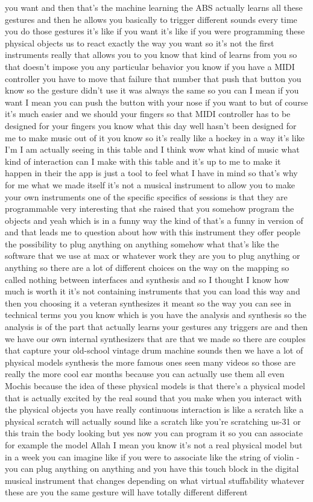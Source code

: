 you want and then that's the machine learning the ABS actually learns all these gestures and then he allows you basically to trigger different sounds every time you do those gestures it's like if you want it's like if you were programming these physical objects us to react exactly the way you want so it's not the first instruments really that allows you to you know that kind of learns from you so that doesn't impose you any particular behavior you know if you have a MIDI controller you have to move that failure that number that push that button you know so the gesture didn't use it was always the same so you can I mean if you want I mean you can push the button with your nose if you want to but of course it's much easier and we should your fingers so that MIDI controller has to be designed for your fingers you know what this day well hasn't been designed for me to make music out of it you know so it's really like a hockey in a way it's like I'm I am actually seeing in this table and I think wow what kind of music what kind of interaction can I make with this table and it's up to me to make it happen in their the app is just a tool to feel what I have in mind so that's why for me what we made itself it's not a musical instrument to allow you to make your own instruments one of the specific specifics of sessions is that they are programmable very interesting that she raised that you somehow program the objects and yeah which is in a funny way the kind of that's a funny in version of and that leads me to question about how with this instrument they offer people the possibility to plug anything on anything somehow what that's like the software that we use at max or whatever work they are you to plug anything or anything so there are a lot of different choices on the way on the mapping so called nothing between interfaces and synthesis and so I thought I know how much is worth it it's not containing instruments that you can load this way and then you choosing it a veteran synthesizes it meant so the way you can see in technical terms you you know which is you have the analysis and synthesis so the analysis is of the part that actually learns your gestures any triggers are and then we have our own internal synthesizers that are that we made so there are couples that capture your old-school vintage drum machine sounds then we have a lot of physical models synthesis the more famous ones seen many videos so those are really the more cool ear months because you can actually use them all even Mochis because the idea of these physical models is that there's a physical model that is actually excited by the real sound that you make when you interact with the physical objects you have really continuous interaction is like a scratch like a physical scratch will actually sound like a scratch like you're scratching us-31 or this train the body looking but yes now you can program it so you can associate for example the model Allah I mean you know it's not a real physical model but in a week you can imagine like if you were to associate like the string of violin - you can plug anything on anything and you have this touch block in the digital musical instrument that changes depending on what virtual stuffability whatever these are you the same gesture will have totally different different 